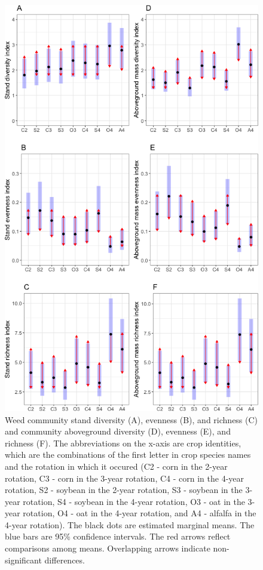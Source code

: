 \documentclass[
]{article}
\begin{document}
\begin{figure}
\centering
\includegraphics{Manuscript_whole_files/figure-latex/index-arrow-p-1.png}
\caption{\label{fig:index-arrow-p}Weed community stand diversity (A), evenness (B), and richness (C) and community aboveground diversity (D), evenness (E), and richness (F). The abbreviations on the x-axis are crop identities, which are the combinations of the first letter in crop species names and the rotation in which it occured (C2 - corn in the 2-year rotation, C3 - corn in the 3-year rotation, C4 - corn in the 4-year rotation, S2 - soybean in the 2-year rotation, S3 - soybean in the 3-year rotation, S4 - soybean in the 4-year rotation, O3 - oat in the 3-year rotation, O4 - oat in the 4-year rotation, and A4 - alfalfa in the 4-year rotation). The black dots are estimated marginal means. The blue bars are 95\% confidence intervals. The red arrows reflect comparisons among means. Overlapping arrows indicate non-significant differences.}
\end{figure}
\end{document}
